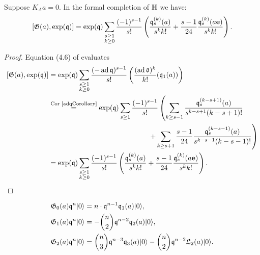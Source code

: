 \begin{proposition}
Suppose $K_Aa=0$.
In the formal completion of $\mathbb{H}$ we have:
$$
\left[ \mathfrak{G}(a),\exp(\mathfrak{q})\right] =
\exp(\mathfrak{q}) \sum_{\substack{s\geq 1\\k\geq 0}}\frac{(-1)^{s-1}}{s!}\left(\frac{\mathfrak{q}_s^{(k)}(a)}{s^{k}k!} + \frac{s-1}{24}\frac{\mathfrak{q}_s^{(k)}(a\mathbf e)}{s^{k}k!}\right).
$$
\end{proposition}
\begin{proof}
Equation (4.6) of \cite{LehnSorger} evaluates 
\begin{align*}
\left[ \G(a),\exp(\q)\right] &= \exp(\q) \sum_{\substack{s\geq 1\\k\geq 0}} \frac{(-\ad \q)^{s-1}}{s!}\left(\frac{(\ad \mathfrak d)^k}{k!} (\q_1(a)) \right) \\
 &\stackrel{\text{Cor \ref{adqCorollary}}}{=} \exp(\q)  \sum_{s\geq 1}\frac{(-1)^{s-1}}{s!}\left(\sum_{k\geq s-1}\frac{\q_s^{(k-s+1)}(a)}{s^{k-s+1}(k-s+1)!}
  \right.\\&\hspace{140pt} \left. + \sum_{k\geq s+1}\frac{s-1}{24}\frac{\q_s^{(k-s-1)}(a)}{s^{k-s-1}(k-s-1)!} \right)\\
  &=\exp(\q) \sum_{\substack{s\geq 1\\k\geq 0}}\frac{(-1)^{s-1}}{s!}\left(\frac{\q_s^{(k)}(a)}{s^{k}k!} + \frac{s-1}{24}\frac{\q_s^{(k)}(a\mathbf e)}{s^{k}k!}\right).
\qedhere
\end{align*}
\end{proof}
\begin{example} 
\begin{align}
 \mathfrak{G}_0(a)\mathfrak{q}^n|0\rangle & = n\cdot \mathfrak{q}^{n-1}\mathfrak{q}_1(a)|0\rangle, \\
 \mathfrak{G}_1(a)\mathfrak{q}^n|0\rangle & = -\binom{n}{2} \mathfrak{q}^{n-2}\mathfrak{q}_2(a)|0\rangle, \\
 \mathfrak{G}_2(a)\mathfrak{q}^n|0\rangle & = \binom{n}{3} \mathfrak{q}^{n-3}\mathfrak{q}_3(a)|0\rangle - \binom{n}{2} \mathfrak{q}^{n-2}\mathfrak{L}_2(a)|0\rangle.
\end{align}
\end{example}

